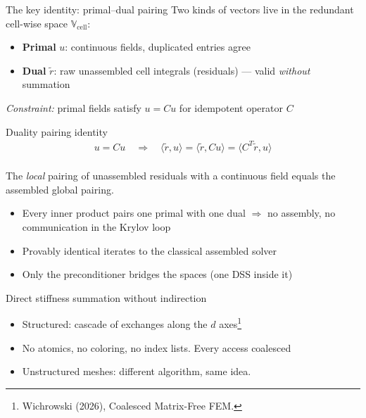 \documentclass{beamer}
\begin{document}
\begin{frame}{The key identity: primal--dual pairing}
    Two kinds of vectors live in the redundant cell-wise space $\mathbb V_{\text{cell}}$:
    \begin{itemize}
        \small
        \item \textbf{Primal} $u$: continuous fields, duplicated entries agree
        \item \textbf{Dual} $\tilde r$: raw unassembled cell integrals (residuals) --- valid \emph{without} summation
    \end{itemize}
    \emph{Constraint:} primal fields satisfy $u = Cu$ for idempotent operator $C$

    \begin{block}{Duality pairing identity}
        \vspace{-1.2em}
        \begin{gather*}
            u = Cu \quad\Longrightarrow\quad
            \langle \tilde r, u \rangle
            = \langle \tilde r, C u \rangle
            = \langle C^T \tilde r, u \rangle
        \end{gather*}
        \vspace{-1.6em}\\
        {\small The \emph{local} pairing of unassembled residuals with a continuous field
        \alert{equals the assembled global pairing.}}
    \end{block}
    \begin{itemize}
        \small
        \item Every inner product pairs one primal with one dual $\Rightarrow$ \alert{no assembly, no communication in the Krylov
                  loop}
        \item Provably identical iterates to the classical assembled solver
        \item Only the preconditioner bridges the spaces (one DSS inside it)
    \end{itemize}
\end{frame}

\begin{frame}{Direct stiffness summation without indirection}
    \begin{itemize}
        \item Structured: cascade of exchanges along the $d$ axes\footnote{Wichrowski (2026), Coalesced Matrix-Free FEM.}
    \end{itemize}
    \begin{center}
        \resizebox{0.98\textwidth}{!}{}
    \end{center}
    \vspace{0.5em}
    \begin{itemize}
        \item No atomics, no coloring, no index lists. Every access coalesced \pause
        \item Unstructured meshes: different algorithm, same idea.
    \end{itemize}
\end{frame}
\end{document}
